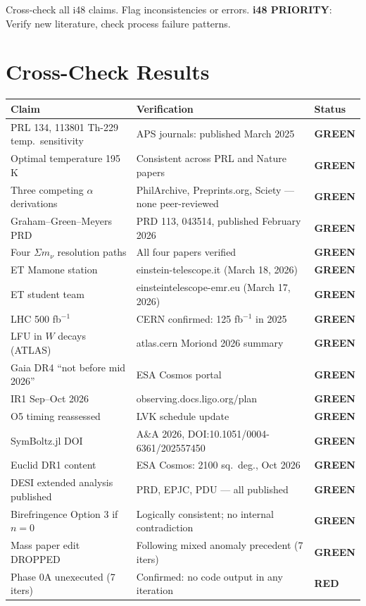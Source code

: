 \documentclass[11pt,a4paper]{article}
\newcommand{\GREEN}{\textcolor{dfdgreen}{\textbf{GREEN}}}
\newcommand{\RED}{\textcolor{dfdred}{\textbf{RED}}}
\begin{document}
Cross-check all i48 claims. Flag inconsistencies or errors. \textbf{i48 PRIORITY}: Verify new literature, check process failure patterns.

\section{Cross-Check Results}

\begin{center}
\begin{tabular}{lp{7cm}l}
\toprule
\textbf{Claim} & \textbf{Verification} & \textbf{Status} \\
\midrule
PRL 134, 113801 Th-229 temp.\ sensitivity & APS journals: published March 2025 & \GREEN \\
Optimal temperature 195 K & Consistent across PRL and Nature papers & \GREEN \\
Three competing $\alpha$ derivations & PhilArchive, Preprints.org, Sciety --- none peer-reviewed & \GREEN \\
Graham--Green--Meyers PRD & PRD 113, 043514, published February 2026 & \GREEN \\
Four $\Sigma m_\nu$ resolution paths & All four papers verified & \GREEN \\
ET Mamone station & einstein-telescope.it (March 18, 2026) & \GREEN \\
ET student team & einsteintelescope-emr.eu (March 17, 2026) & \GREEN \\
LHC 500 fb$^{-1}$ & CERN confirmed: 125 fb$^{-1}$ in 2025 & \GREEN \\
LFU in $W$ decays (ATLAS) & atlas.cern Moriond 2026 summary & \GREEN \\
Gaia DR4 ``not before mid 2026'' & ESA Cosmos portal & \GREEN \\
IR1 Sep--Oct 2026 & observing.docs.ligo.org/plan & \GREEN \\
O5 timing reassessed & LVK schedule update & \GREEN \\
SymBoltz.jl DOI & A\&A 2026, DOI:10.1051/0004-6361/202557450 & \GREEN \\
Euclid DR1 content & ESA Cosmos: 2100 sq.\ deg., Oct 2026 & \GREEN \\
DESI extended analysis published & PRD, EPJC, PDU --- all published & \GREEN \\
Birefringence Option 3 if $n=0$ & Logically consistent; no internal contradiction & \GREEN \\
Mass paper edit DROPPED & Following mixed anomaly precedent (7 iters) & \GREEN \\
Phase 0A unexecuted (7 iters) & Confirmed: no code output in any iteration & \RED \\
\bottomrule
\end{tabular}
\end{center}
\end{document}
